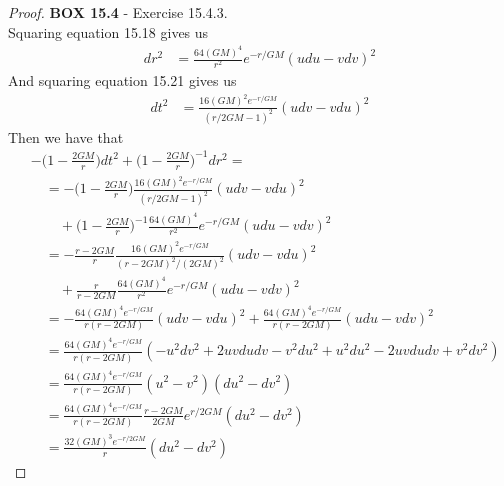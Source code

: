 \documentclass[11pt]{article}
\theoremstyle{definition}
\begin{document}
\cleardoublepage
\begin{proof}{\textbf{BOX 15.4} - Exercise 15.4.3.}\\
Squaring equation 15.18 gives us
\begin{align*}
    dr^2 &= \frac{64(GM)^4}{r^2}e^{-r/GM}(udu - vdv)^2
\end{align*}
And squaring equation 15.21 gives us
\begin{align*}
    dt^2 &= \frac{16(GM)^2e^{-r/GM}}{(r/2GM - 1)^2}(udv - vdu)^2
\end{align*}
Then we have that
\begin{align*}
    &-\bigg(1 - \frac{2GM}{r}\bigg)dt^2 + \bigg(1 - \frac{2GM}{r}\bigg)^{-1}dr^2 = \\
    &\quad = -\bigg(1 - \frac{2GM}{r}\bigg)
    \frac{16(GM)^2e^{-r/GM}}{(r/2GM - 1)^2}(udv - vdu)^2\\
    &\qquad + \bigg(1 - \frac{2GM}{r}\bigg)^{-1}
    \frac{64(GM)^4}{r^2}e^{-r/GM}(udu - vdv)^2\\
    &\quad = -\frac{r - 2GM}{r}
    \frac{16(GM)^2e^{-r/GM}}{(r - 2GM)^2/(2GM)^2}(udv - vdu)^2\\
    &\qquad + \frac{r}{r - 2GM}
    \frac{64(GM)^4}{r^2}e^{-r/GM}(udu - vdv)^2\\
    &\quad = -\frac{64(GM)^4e^{-r/GM}}{r(r - 2GM)}(udv - vdu)^2
    + \frac{64(GM)^4e^{-r/GM}}{r(r - 2GM)}(udu - vdv)^2\\
    &\quad = \frac{64(GM)^4e^{-r/GM}}{r(r - 2GM)}
    (-u^2dv^2 + 2uvdudv - v^2du^2 + u^2du^2 - 2uvdudv + v^2dv^2)\\
    &\quad = \frac{64(GM)^4e^{-r/GM}}{r(r - 2GM)}(u^2 - v^2)(du^2 - dv^2)\\
    &\quad = \frac{64(GM)^4e^{-r/GM}}{r(r - 2GM)}\frac{r - 2GM}{2GM}e^{r/2GM}(du^2 - dv^2)\\
    &\quad = \frac{32(GM)^3e^{-r/2GM}}{r}(du^2 - dv^2)
\end{align*}

\end{proof}
\end{document}
